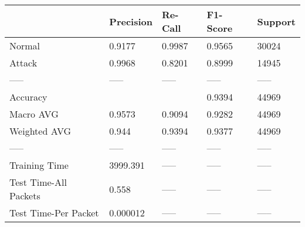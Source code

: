 \begin{tabular}{lllll}
\toprule
{} & Precision & Re-Call & F1-Score & Support \\
\midrule
Normal                &    0.9177 &  0.9987 &   0.9565 &   30024 \\
Attack                &    0.9968 &  0.8201 &   0.8999 &   14945 \\
-----                 &     ----- &   ----- &    ----- &   ----- \\
Accuracy              &           &         &   0.9394 &   44969 \\
Macro AVG             &    0.9573 &  0.9094 &   0.9282 &   44969 \\
Weighted AVG          &     0.944 &  0.9394 &   0.9377 &   44969 \\
-----                 &     ----- &   ----- &    ----- &   ----- \\
Training Time         &  3999.391 &   ----- &    ----- &   ----- \\
Test Time-All Packets &     0.558 &   ----- &    ----- &   ----- \\
Test Time-Per Packet  &  0.000012 &   ----- &    ----- &   ----- \\
\bottomrule
\end{tabular}
